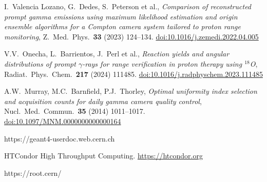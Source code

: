 \documentclass[a4paper]{article}
\begin{document}
\begin{thebibliography}{}
I.~Valencia Lozano, G.~Dedes, S.~Peterson et al.,
\emph{Comparison of reconstructed prompt gamma emissions using maximum likelihood estimation and origin ensemble algorithms for a Compton camera system tailored to proton range monitoring},
Z.\ Med.\ Phys.\ \textbf{33} (2023) 124--134.
\href{https://doi.org/10.1016/j.zemedi.2022.04.005}{doi:10.1016/j.zemedi.2022.04.005}

V.V.~Onecha, L.~Barrientos, J.~Perl et al.,
\emph{Reaction yields and angular distributions of prompt $\gamma$-rays for range verification in proton therapy using $^{18}$O},
Radiat.\ Phys.\ Chem.\ \textbf{217} (2024) 111485.
\href{https://doi.org/10.1016/j.radphyschem.2023.111485}{doi:10.1016/j.radphyschem.2023.111485}

A.W.~Murray, M.C.~Barnfield, P.J.~Thorley,
\emph{Optimal uniformity index selection and acquisition counts for daily gamma camera quality control},
Nucl.\ Med.\ Commun.\ \textbf{35} (2014) 1011--1017.
\href{https://doi.org/10.1097/MNM.0000000000000164}{doi:10.1097/MNM.0000000000000164}

https://geant4-userdoc.web.cern.ch

HTCondor High Throughput Computing.
\href{https://htcondor.org}{https://htcondor.org}

https://root.cern/

\end{thebibliography}
\end{document}
